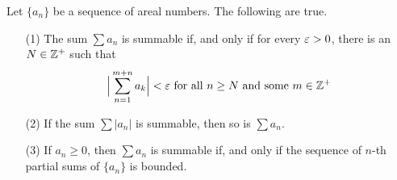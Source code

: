 \begin{lemma}\label{1.3.7}
    Let $\{a_n\}$ be a sequence of areal numbers. The following are true.
    \begin{enumerate}
        \item[(1)] The sum $\sum{a_n}$ is summable if, and only if for every
            $\varepsilon>0$, there is an  $N \in \mathbb{Z}^+$ such that
            \begin{equation*}
                \Big{|} \sum_{n=1}^{m+n}{a_k} \Big{|}<\varepsilon \text{ for all } n \geq
                N \text{ and some } m \in \mathbb{Z}^+
            \end{equation*}

        \item[(2)] If the sum $\sum{|a_n|}$ is summable, then so is $\sum{a_n}$.

        \item[(3)] If $a_n \geq 0$, then  $\sum{a_n}$ is summable if, and only
            if the sequence of $n$-th partial sums of $\{a_n\}$ is bounded.
    \end{enumerate}
\end{lemma}
